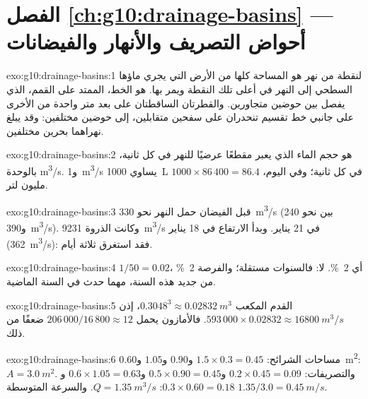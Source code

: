 \section*{الفصل \ref{ch:g10:drainage-basins} --- أحواض التصريف والأنهار والفيضانات}

\begin{solution}{exo:g10:drainage-basins:1}
 لنقطة من نهر هو المساحة كلها من الأرض التي يجري ماؤها السطحي إلى
النهر في أعلى تلك النقطة ويمر بها.  هو الخط، الممتد على القمم، الذي
يفصل بين حوضين متجاورين. والقطرتان الساقطتان على بعد متر واحدة من الأخرى على جانبي
خط تقسيم تنحدران على سفحين متقابلين، إلى حوضين مختلفين: وقد يبلغ نهراهما بحرين
مختلفين.
\end{solution}

\begin{solution}{exo:g10:drainage-basins:2}
 هو حجم الماء الذي يعبر مقطعًا عرضيًا للنهر في كل ثانية، بالوحدة
\unit{m^3/s}. و\qty{1}{m^3/s} يساوي \qty{1000}{L} في كل ثانية؛ وفي اليوم،
$1000 \times 86\,400 = 86.4$ مليون لتر.
\end{solution}

\begin{solution}{exo:g10:drainage-basins:3}
قبل الفيضان حمل النهر نحو \qty{330}{m^3/s} (بين نحو
\num{240} و\qty{390}{m^3/s}). وكانت الذروة \qty{9231}{m^3/s} في
21 يناير. وبدأ الارتفاع في 18 يناير (\qty{362}{m^3/s}): فقد استغرق ثلاثة
أيام.
\end{solution}

\begin{solution}{exo:g10:drainage-basins:4}
$1/50 = 0.02$، أي \qty{2}{\percent}. لا: فالسنوات مستقلة؛ والفرصة
\qty{2}{\percent} من جديد هذه السنة، مهما حدث في السنة الماضية.
\end{solution}

\begin{solution}{exo:g10:drainage-basins:5}
القدم المكعب $0.3048^3 \approx \qty{0.02832}{m^3}$، إذن
$593\,000 \times 0.02832 \approx \qty{16800}{m^3/s}$. فالأمازون يحمل
$206\,000/16\,800 \approx 12$ ضعفًا من ذلك.
\end{solution}

\begin{solution}{exo:g10:drainage-basins:6}
مساحات الشرائح: $1.5 \times 0.3 = 0.45$ و$0.90$ و$1.05$ و\qty{0.60}{m^2}:
$A = \qty{3.0}{m^2}$. والتصريفات: $0.2 \times 0.45 = 0.09$ و$0.5 \times 0.90
= 0.45$ و$0.6 \times 1.05 = 0.63$ و$0.3 \times 0.60 = 0.18$: $Q =
\qty{1.35}{m^3/s}$. والسرعة المتوسطة $1.35/3.0 = \qty{0.45}{m/s}$.
\end{solution}

